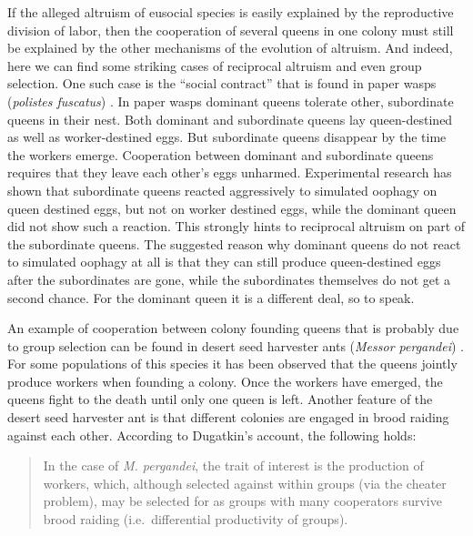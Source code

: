 If the alleged altruism of eusocial species is easily explained by the
reproductive division of labor, then the cooperation of several queens in one
colony must still be explained by the other mechanisms of the evolution of
altruism. And indeed, here we can find some striking cases of reciprocal
altruism and even group selection. One such case is the ``social contract''
that is found in paper wasps ({\em polistes fuscatus}) \cite[p.\ 
157/158]{dugatkin:1997}. In paper wasps dominant queens tolerate other,
subordinate queens in their nest. Both dominant and subordinate queens lay
queen-destined as well as worker-destined eggs. But subordinate queens
disappear by the time the workers emerge. Cooperation between dominant and
subordinate queens requires that they leave each other's eggs unharmed.
Experimental research has shown that subordinate queens reacted aggressively
to simulated oophagy on queen destined eggs, but not on worker destined eggs,
while the dominant queen did not show such a reaction. This strongly hints to
reciprocal altruism on part of the subordinate queens. The suggested reason
why dominant queens do not react to simulated oophagy at all is that they can
still produce queen-destined eggs after the subordinates are gone, while the
subordinates themselves do not get a second chance. For the dominant queen it
is a different deal, so to speak.

An example of cooperation between colony founding queens that is probably due
to group selection can be found in desert seed harvester ants ({\em Messor
  pergandei}) \cite[p.\ 159]{dugatkin:1997}. For some populations of this
species it has been observed that the queens jointly produce workers when
founding a colony. Once the workers have emerged, the queens fight to the death
until only one queen is left. Another feature of the desert seed harvester ant
is that different colonies are engaged in brood raiding against each other.
According to Dugatkin's account, the following holds:

\begin{quotation}
  In the case of {\em M. pergandei}, the trait of interest is the production
  of workers, which, although selected against within groups (via the cheater
  problem), may be selected for as groups with many cooperators survive brood
  raiding (i.e.\ differential productivity of groups). \cite[p.\ 
  160]{dugatkin:1997}
\end{quotation}

